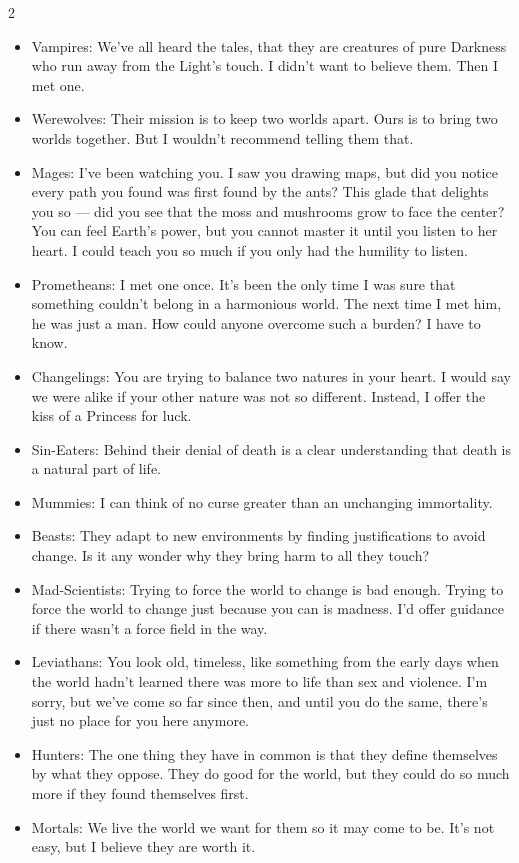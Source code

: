 \begin{multicols}{2}
\begin{itemize}
\item Vampires: We’ve all heard the tales, that they are creatures of pure Darkness who run away from the Light’s touch. I didn’t want to believe them. Then I met one.
\item Werewolves: Their mission is to keep two worlds apart. Ours is to bring two worlds together. But I wouldn't recommend telling them that. 
\item Mages: I've been watching you. I saw you drawing maps, but did you notice every path you found was first found by the ants? This glade that delights you so — did you see that the moss and mushrooms grow to face the center? You can feel Earth's power, but you cannot master it until you listen to her heart. I could teach you so much if you only had the humility to listen.
\item Prometheans: I met one once. It’s been the only time I was sure that something couldn’t belong in a harmonious world. The next time I met him, he was just a man. How could anyone overcome such a burden? I have to know.
\item Changelings: You are trying to balance two natures in your heart. I would say we were alike if your other nature was not so different. Instead, I offer the kiss of a Princess for luck.
\item Sin-Eaters: Behind their denial of death is a clear understanding that death is a natural part of life. 
\item Mummies: I can think of no curse greater than an unchanging immortality.  
\item Beasts: They adapt to new environments by finding justifications to avoid change. Is it any wonder why they bring harm to all they touch?
\item Mad-Scientists: Trying to force the world to change is bad enough. Trying to force the world to change just because you can is madness. I'd offer guidance if there wasn't a force field in the way.
\item Leviathans: You look old, timeless, like something from the early days when the world hadn't learned there was more to life than sex and violence. I'm sorry, but we've come so far since then, and until you do the same, there's just no place for you here anymore.

\item Hunters: The one thing they have in common is that they define themselves by what they oppose. They do good for the world, but they could do so much more if they found themselves first.
\item Mortals: We live the world we want for them so it may come to be. It’s not easy, but I believe they are worth it. \end{itemize}


\end{multicols}
